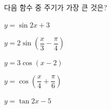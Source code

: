 다음 함수 중 주기가 가장 큰 것은?
\begin{choices32}{\rule[-3ex]{0pt}{8ex}$y=\sin 2x+3$}{\rule[-3ex]{0pt}{8ex}$y=2\sin\left(\dfrac{x}{3}-\dfrac{\pi}{4}\right)$}{\rule[-3ex]{0pt}{8ex}$y=3\cos(x-2)$}{\rule[-3ex]{0pt}{8ex}$y=\cos\left(\dfrac{x}{4}+\dfrac{\pi}{6}\right)$}{\rule[-3ex]{0pt}{8ex}$y=\tan 2x-5$}\end{choices32}
